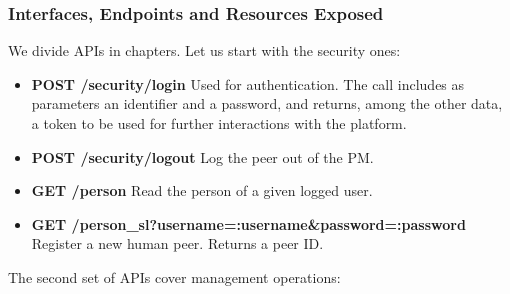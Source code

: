 \subsubsection{Interfaces, Endpoints and Resources Exposed}
We divide APIs in chapters. Let us start with the security ones:
\begin{itemize}
\item {\bf POST /security/login} Used for authentication. The call includes as parameters an identifier and a password, and returns, among the other data, a token to be used for further interactions with the platform.
\item {\bf POST /security/logout} Log the peer out of the PM.
\item {\bf GET /person} Read the person of a given logged user. 
\item {\bf GET /person\_sl?username=:username\&password=:password} Register a new human peer. Returns a peer ID. 
\end{itemize}
The second set of APIs cover management operations:
